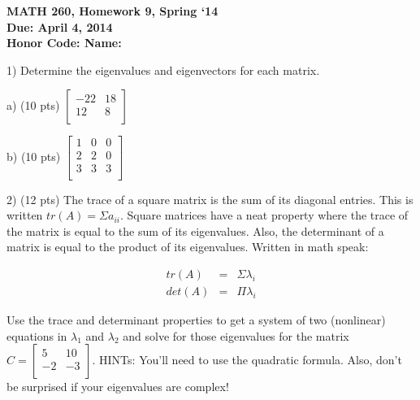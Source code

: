 \documentclass{article}
\begin{document}
\begin{flushleft}
	\bfseries{MATH 260, Homework 9, Spring `14}\\
	\bfseries{Due: April 4, 2014}\\
	\bfseries{Honor Code:} \hspace{3.5in}\bfseries{Name:}\\
\end{flushleft}
\begin{flushleft}
\vspace{.25in}

1) Determine the eigenvalues and eigenvectors for each matrix.

\vspace{0.2in}

a) (10 pts) $\begin{bmatrix} -22&18\\12&8\\ \end{bmatrix}$

\pagebreak

b) (10 pts) $\begin{bmatrix} 1&0&0\\2&2&0\\3&3&3\\ \end{bmatrix}$

\pagebreak

2) (12 pts) The trace of a square matrix is the sum of its diagonal entries.  This is written $tr(A) = \Sigma a_{ii}$.  Square matrices have a neat property where the trace of the matrix is equal to the sum of its eigenvalues.  Also, the determinant of a matrix is equal to the product of its eigenvalues.  Written in math speak:

\begin{eqnarray*}
tr(A) &=& \Sigma \lambda_i\\
det(A) &=& \Pi \lambda_i
\end{eqnarray*}

Use the trace and determinant properties to get a system of two (nonlinear) equations in $\lambda_1$ and $\lambda_2$ and solve for those eigenvalues for the matrix $C = \begin{bmatrix} 5&10\\-2&-3\\ \end{bmatrix}$.  HINTs:  You'll need to use the quadratic formula.  Also, don't be surprised if your eigenvalues are complex!





\end{flushleft}
\end{document}
